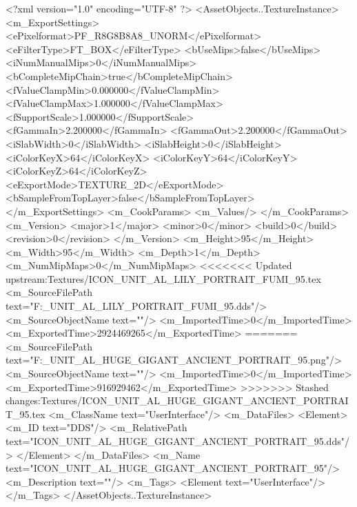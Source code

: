 <?xml version="1.0" encoding="UTF-8" ?>
<AssetObjects..TextureInstance>
	<m_ExportSettings>
		<ePixelformat>PF_R8G8B8A8_UNORM</ePixelformat>
		<eFilterType>FT_BOX</eFilterType>
		<bUseMips>false</bUseMips>
		<iNumManualMips>0</iNumManualMips>
		<bCompleteMipChain>true</bCompleteMipChain>
		<fValueClampMin>0.000000</fValueClampMin>
		<fValueClampMax>1.000000</fValueClampMax>
		<fSupportScale>1.000000</fSupportScale>
		<fGammaIn>2.200000</fGammaIn>
		<fGammaOut>2.200000</fGammaOut>
		<iSlabWidth>0</iSlabWidth>
		<iSlabHeight>0</iSlabHeight>
		<iColorKeyX>64</iColorKeyX>
		<iColorKeyY>64</iColorKeyY>
		<iColorKeyZ>64</iColorKeyZ>
		<eExportMode>TEXTURE_2D</eExportMode>
		<bSampleFromTopLayer>false</bSampleFromTopLayer>
	</m_ExportSettings>
	<m_CookParams>
		<m_Values/>
	</m_CookParams>
	<m_Version>
		<major>1</major>
		<minor>0</minor>
		<build>0</build>
		<revision>0</revision>
	</m_Version>
	<m_Height>95</m_Height>
	<m_Width>95</m_Width>
	<m_Depth>1</m_Depth>
	<m_NumMipMaps>0</m_NumMipMaps>
<<<<<<< Updated upstream:Textures/ICON_UNIT_AL_LILY_PORTRAIT_FUMI_95.tex
	<m_SourceFilePath text="F:\DT\lilyimages\gpportrait\ICON_UNIT_AL_LILY_PORTRAIT_FUMI_95.dds"/>
	<m_SourceObjectName text=""/>
	<m_ImportedTime>0</m_ImportedTime>
	<m_ExportedTime>2924469265</m_ExportedTime>
=======
	<m_SourceFilePath text="F:\DT\lilyimages\all\ICON_UNIT_AL_HUGE_GIGANT_ANCIENT_PORTRAIT_95.png"/>
	<m_SourceObjectName text=""/>
	<m_ImportedTime>0</m_ImportedTime>
	<m_ExportedTime>916929462</m_ExportedTime>
>>>>>>> Stashed changes:Textures/ICON_UNIT_AL_HUGE_GIGANT_ANCIENT_PORTRAIT_95.tex
	<m_ClassName text="UserInterface"/>
	<m_DataFiles>
		<Element>
			<m_ID text="DDS"/>
			<m_RelativePath text="ICON_UNIT_AL_HUGE_GIGANT_ANCIENT_PORTRAIT_95.dds"/>
		</Element>
	</m_DataFiles>
	<m_Name text="ICON_UNIT_AL_HUGE_GIGANT_ANCIENT_PORTRAIT_95"/>
	<m_Description text=""/>
	<m_Tags>
		<Element text="UserInterface"/>
	</m_Tags>
</AssetObjects..TextureInstance>

